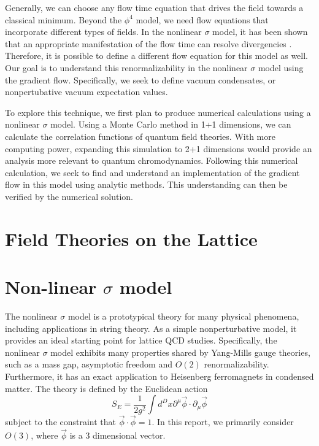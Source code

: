 \documentclass[12pt]{report}
\begin{document}
Generally, we can choose any flow time equation that drives the field towards a classical minimum. Beyond the $\phi^4$ model, we need flow equations that incorporate different types of fields. In the nonlinear $\sigma$ model, it has been shown that an appropriate manifestation of the flow time can resolve divergencies \cite{makino2015a}. Therefore, it is possible to define a different flow equation for this model as well. Our goal is to understand this renormalizability in the nonlinear $\sigma$ model using the gradient flow. Specifically, we seek to define vacuum condensates, or nonpertubative vacuum expectation values.

To explore this technique, we first plan to produce numerical calculations using a nonlinear $\sigma$ model. Using a Monte Carlo method in 1+1 dimensions, we can calculate the correlation functions of quantum field theories. With more computing power, expanding this simulation to 2+1 dimensions would provide an analysis more relevant to quantum chromodynamics.  Following this numerical calculation, we seek to find and understand an implementation of the gradient flow in this model using analytic methods. This understanding can then be verified by the numerical solution. 

\section{Field Theories on the Lattice}
\section{Non-linear $\sigma$ model}

The nonlinear $\sigma$ model is a prototypical theory for many physical phenomena, including applications in string theory. As a simple nonperturbative model, it provides an ideal starting point for lattice QCD studies. Specifically, the nonlinear $\sigma$ model exhibits many properties shared by Yang-Mills gauge theories, such as a mass gap, asymptotic freedom and $O(2)$ renormalizability. Furthermore, it has an exact application to Heisenberg ferromagnets in condensed matter. The theory is defined by the Euclidean action 
\begin{equation}
    S_E = \frac{1}{2g^2} \int d^Dx \partial^\mu \vec\phi \cdot \partial_\mu \vec\phi
\end{equation}
subject to the constraint that $\vec\phi\cdot\vec\phi = 1$. In this report, we primarily consider $O(3)$, where $\vec\phi$ is a $3$ dimensional vector.
\end{document}
